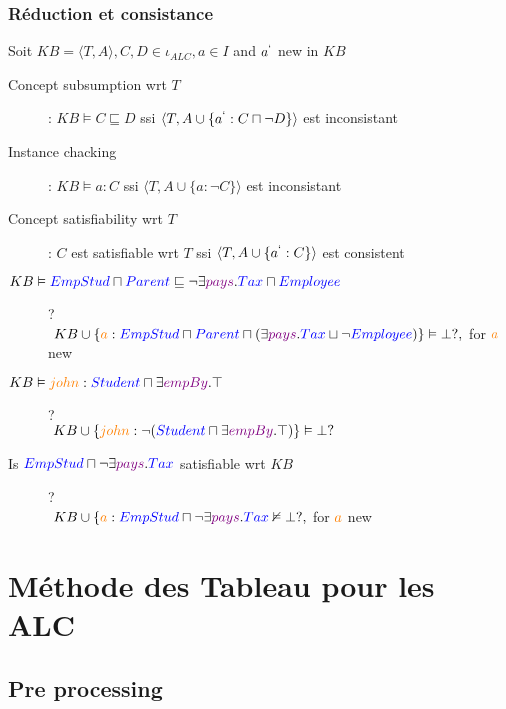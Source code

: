 \subsection{Réduction et consistance}
Soit $KB = \langle T,A \rangle , C, D \in \iota_{ALC}, a \in I$ and $ a^` $ new in $KB$\\
\begin{description}
\item[Concept subsumption wrt $T$]: $KB \vDash C \sqsubseteq D$ ssi $\langle T, A \cup \{ a^` : C \sqcap \neg D \} \rangle$ est inconsistant
\item[Instance chacking]: $KB \vDash a : C$ ssi $\langle T, A \cup \{ a : \neg C \} \rangle$ est inconsistant
\item[Concept satisfiability wrt $T$]: $C$ est satisfiable wrt $T$ ssi $\langle T,A \cup \{ a^` : C \} \rangle$ est consistent
\end{description}
\begin{description}
\item[$KB \vDash \textcolor{blue}{EmpStud} \sqcap \textcolor{blue}{Parent} \sqsubseteq \neg \exists \textcolor{violet}{pays}.\textcolor{blue}{Tax} \sqcap \textcolor{blue}{Employee} $]?\\ $\ KB \cup \{ \textcolor{orange}{a} : \textcolor{blue}{EmpStud} \sqcap \textcolor{blue}{Parent} \sqcap (\exists \textcolor{violet}{pays}.\textcolor{blue}{Tax} \sqcup \neg \textcolor{blue}{Employee} ) \} \vDash \bot ?,$ for $\textcolor{orange}{a}$ new
\item[$KB \vDash \textcolor{orange}{john} : \textcolor{blue}{Student} \sqcap \exists \textcolor{violet}{empBy}.\top $]?\\  $\ KB \cup \{ \textcolor{orange}{john} : \neg (\textcolor{blue}{Student} \sqcap \exists \textcolor{violet}{empBy}.\top)\} \vDash \bot ?$
\item[Is $\textcolor{blue}{EmpStud} \sqcap \neg \exists \textcolor{violet}{pays}.\textcolor{blue}{Tax}$ satisfiable wrt $KB$ ]?\\ $\ KB \cup \{ \textcolor{orange}{a} : \textcolor{blue}{EmpStud} \sqcap \neg \exists \textcolor{violet}{pays}.\textcolor{blue}{Tax} \nvDash \bot ?,$ for $\textcolor{orange}{a}$ new
\end{description}

\chapter{Méthode des Tableau pour les ALC}
\section{Pre processing}
